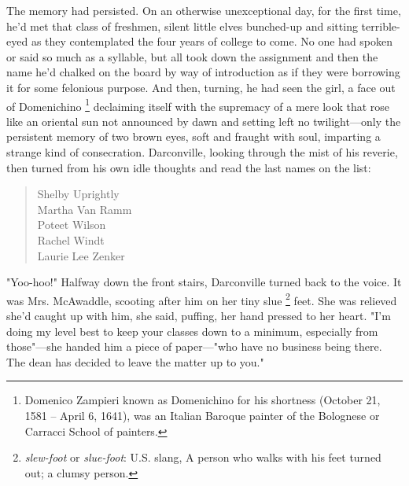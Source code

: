   The memory had persisted. On an otherwise unexceptional day, for the first
time, he'd met that class of freshmen, silent little elves bunched-up 
and sitting terrible-eyed as they contemplated the four years of college to 
come. No one had spoken or said so much as a syllable, but all took down the 
assignment and then the name he'd chalked on the board by way of introduction 
as if they were borrowing it for some felonious purpose. And then, turning, he 
had seen the girl, a face out of Domenichino 
\footnote{ Domenico Zampieri known as Domenichino for his shortness (October 21,
1581 – April 6, 1641), was an Italian Baroque painter of the Bolognese or
Carracci School of painters.
}
declaiming 
itself with the supremacy of a mere look that rose like an oriental sun not 
announced by dawn and setting left no twilight---only the persistent memory 
of two brown eyes, soft and fraught 
with soul, imparting 
a strange kind of consecration. 
Darconville, looking through the mist of his reverie, 
then turned from his own idle thoughts and read the last names on the list:
 
\begin{verse}
        \hspace{6em} Shelby Uprightly   \\
        \hspace{6em} Martha Van Ramm    \\
        \hspace{6em} Poteet Wilson      \\
        \hspace{6em} Rachel Windt       \\
        \hspace{6em} Laurie Lee Zenker
\end{verse}
 
  "Yoo-hoo!" Halfway down the front stairs, Darconville turned back to the
voice. It was Mrs. McAwaddle, scooting after him on her tiny slue 
\footnote{ \textit{slew-foot} or \textit{slue-foot}: U.S. slang, A person who
  walks with his feet turned out; a clumsy person. }
feet. She was relieved she'd caught up with him, she said, puffing, her hand 
pressed to her heart. "I'm doing my level best to keep your classes down to a 
minimum, especially from those"---she handed him a piece of paper---"who have 
no business being there. The dean has decided to leave the matter up to you."

